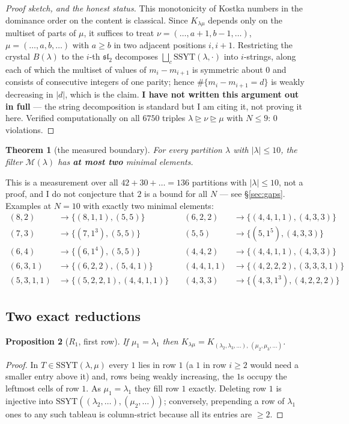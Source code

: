 \documentclass[11pt]{article}
\theoremstyle{plain}
\newtheorem{theorem}{Theorem}
\newtheorem{proposition}[theorem]{Proposition}
\theoremstyle{definition}
\newcommand{\SSYT}{\mathrm{SSYT}}
\DeclareMathOperator{\dom}{\trianglerighteq}
\begin{document}
\begin{proof}[Proof sketch, and the honest status]
This monotonicity of Kostka numbers in the dominance order on the content is classical.
Since $K_{\lambda\mu}$ depends only on the multiset of parts of $\mu$, it suffices to
treat $\nu=(\dots,a+1,b-1,\dots)$, $\mu=(\dots,a,b,\dots)$ with $a\ge b$ in two adjacent
positions $i,i+1$.  Restricting the crystal $B(\lambda)$ to the $i$-th $\mathfrak{sl}_2$
decomposes $\bigsqcup_c \SSYT(\lambda,\cdot)$ into $i$-strings, along each of which the
multiset of values of $m_i-m_{i+1}$ is symmetric about $0$ and consists of consecutive
integers of one parity; hence $\#\{m_i-m_{i+1}=d\}$ is weakly decreasing in $|d|$, which
is the claim.  \textbf{I have not written this argument out in full} --- the string
decomposition is standard but I am citing it, not proving it here.  Verified
computationally on all $6750$ triples $\lambda\dom\nu\dom\mu$ with $N\le9$: $0$
violations.
\end{proof}

\begin{theorem}[the measured boundary]\label{thm:minimal}
For every partition $\lambda$ with $|\lambda|\le 10$, the filter $\mathcal M(\lambda)$ has
\textbf{at most two} minimal elements.
\end{theorem}

This is a measurement over all $42+30+\dots=136$ partitions with $|\lambda|\le10$, not a
proof, and I do not conjecture that $2$ is a bound for all $N$ --- see \S\ref{sec:gaps}.
Examples at $N=10$ with exactly two minimal elements:
\[
\begin{array}{llll}
 (8,2)&\to\{(8,1,1),(5,5)\} &\quad (6,2,2)&\to\{(4,4,1,1),(4,3,3)\}\\
 (7,3)&\to\{(7,1^3),(5,5)\} &\quad (5,5)&\to\{(5,1^5),(4,3,3)\}\\
 (6,4)&\to\{(6,1^4),(5,5)\} &\quad (4,4,2)&\to\{(4,4,1,1),(4,3,3)\}\\
 (6,3,1)&\to\{(6,2,2),(5,4,1)\} &\quad (4,4,1,1)&\to\{(4,2,2,2),(3,3,3,1)\}\\
 (5,3,1,1)&\to\{(5,2,2,1),(4,4,1,1)\} &\quad (4,3,3)&\to\{(4,3,1^3),(4,2,2,2)\}
\end{array}
\]

\subsection{Two exact reductions}

\begin{proposition}[$R_1$, first row]\label{prop:R1}
If $\mu_1=\lambda_1$ then
$K_{\lambda\mu}=K_{(\lambda_2,\lambda_3,\dots),\,(\mu_2,\mu_3,\dots)}$.
\end{proposition}
\begin{proof}
In $T\in\SSYT(\lambda,\mu)$ every $1$ lies in row $1$ (a $1$ in row $i\ge2$ would need a
smaller entry above it) and, rows being weakly increasing, the $1$s occupy the leftmost
cells of row $1$.  As $\mu_1=\lambda_1$ they fill row $1$ exactly.  Deleting row $1$ is
injective into $\SSYT((\lambda_2,\dots),(\mu_2,\dots))$; conversely, prepending a row of
$\lambda_1$ ones to any such tableau is column-strict because all its entries are $\ge2$.
\end{proof}
\end{document}
